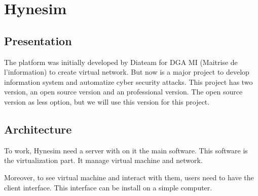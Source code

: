 
\chapter{Hynesim}
\label{chap:hynesim}

\section{Presentation}

The platform was initially developed by Diateam for DGA MI (Maitrise de
l'information) to create virtual network. But now is a major project to develop
information system and automatize cyber security attacks. This project has two
version, an open source version and an professional version. The open source
version as less option, but we will use this version for this project.

\section{Architecture}

To work, Hynesim need a server with on it the main software. This software is
the virtualization part. It manage virtual machine and network.

Moreover, to see virtual machine and interact with them, users need to have the
client interface. This interface can be install on a simple computer.





